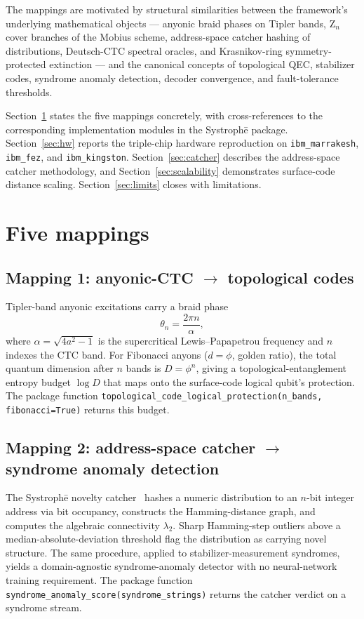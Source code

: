 \documentclass[11pt,a4paper]{article}
\begin{document}
The mappings are motivated by structural similarities between the framework's underlying mathematical objects --- anyonic braid phases on Tipler bands, Z$_n$ cover branches of the Mobius scheme, address-space catcher hashing of distributions, Deutsch-CTC spectral oracles, and Krasnikov-ring symmetry-protected extinction --- and the canonical concepts of topological QEC, stabilizer codes, syndrome anomaly detection, decoder convergence, and fault-tolerance thresholds.

Section~\ref{sec:mappings} states the five mappings concretely, with cross-references to the corresponding implementation modules in the Systroph\=e package. Section~\ref{sec:hw} reports the triple-chip hardware reproduction on \texttt{ibm\_marrakesh}, \texttt{ibm\_fez}, and \texttt{ibm\_kingston}. Section~\ref{sec:catcher} describes the address-space catcher methodology, and Section~\ref{sec:scalability} demonstrates surface-code distance scaling. Section~\ref{sec:limits} closes with limitations.

\section{Five mappings}\label{sec:mappings}

\subsection{Mapping 1: anyonic-CTC $\to$ topological codes}

Tipler-band anyonic excitations carry a braid phase
\begin{equation}
\theta_{n} = \frac{2\pi n}{\alpha},
\end{equation}
where $\alpha = \sqrt{4a^{2}-1}$ is the supercritical Lewis--Papapetrou frequency and $n$ indexes the CTC band. For Fibonacci anyons ($d = \phi$, golden ratio), the total quantum dimension after $n$ bands is $D = \phi^{n}$, giving a topological-entanglement entropy budget $\log D$ that maps onto the surface-code logical qubit's protection. The package function \texttt{topological\_code\_logical\_protection(n\_bands, fibonacci=True)} returns this budget.

\subsection{Mapping 2: address-space catcher $\to$ syndrome anomaly detection}

The Systroph\=e novelty catcher~\cite{SystropheRepo} hashes a numeric distribution to an $n$-bit integer address via bit occupancy, constructs the Hamming-distance graph, and computes the algebraic connectivity $\lambda_{2}$. Sharp Hamming-step outliers above a median-absolute-deviation threshold flag the distribution as carrying novel structure. The same procedure, applied to stabilizer-measurement syndromes, yields a domain-agnostic syndrome-anomaly detector with no neural-network training requirement. The package function \texttt{syndrome\_anomaly\_score(syndrome\_strings)} returns the catcher verdict on a syndrome stream.
\end{document}
